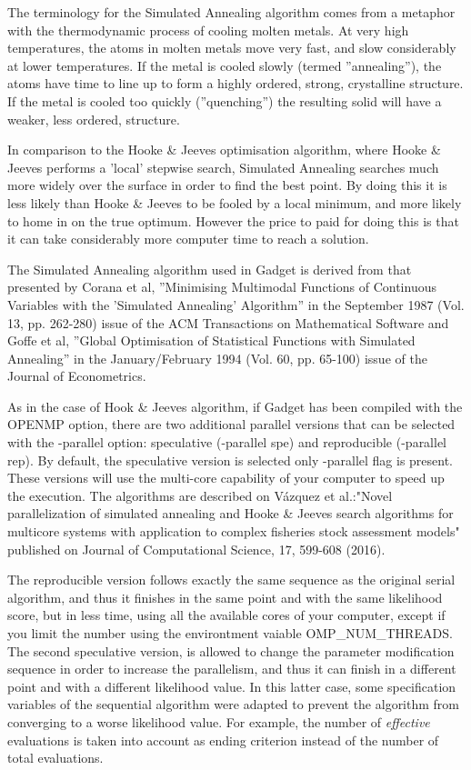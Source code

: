 \documentclass[10pt,twoside]{book}
\begin{document}
\bigskip
The terminology for the Simulated Annealing algorithm comes from a metaphor with the thermodynamic process of cooling molten metals.  At very high temperatures, the atoms in molten metals move very fast, and slow considerably at lower temperatures.  If the metal is cooled slowly (termed ''annealing''), the atoms have time to line up to form a highly ordered, strong, crystalline structure.  If the metal is cooled too quickly (''quenching'') the resulting solid will have a weaker, less ordered, structure.

\bigskip
In comparison to the Hooke \& Jeeves optimisation algorithm, where Hooke \& Jeeves performs a 'local' stepwise search, Simulated Annealing searches much more widely over the surface in order to find the best point.  By doing this it is less likely than Hooke \& Jeeves to be fooled by a local minimum, and more likely to home in on the true optimum.  However the price to paid for doing this is that it can take considerably more computer time to reach a solution.

\bigskip
The Simulated Annealing algorithm used in Gadget is derived from that presented by Corana et al, ''Minimising Multimodal Functions of Continuous Variables with the 'Simulated Annealing' Algorithm'' in the September 1987 (Vol. 13, pp. 262-280) issue of the ACM Transactions on Mathematical Software and Goffe et al, ''Global Optimisation of Statistical Functions with Simulated Annealing'' in the January/February 1994 (Vol. 60, pp. 65-100) issue of the Journal of Econometrics.

\bigskip
As in the case of Hook \& Jeeves algorithm, if Gadget has been compiled with the OPENMP option, there are two additional parallel versions that can be selected with the -parallel option: speculative (-parallel spe) and reproducible (-parallel rep). By default, the speculative version is selected only -parallel flag is present. These versions will use the multi-core capability of your computer to speed up the execution. The algorithms are described on V\'azquez et al.:"Novel parallelization of simulated annealing and Hooke \& Jeeves search algorithms for multicore systems with application to complex fisheries stock assessment models" published on Journal of Computational Science, 17, 599-608 (2016). 

\bigskip
The reproducible version follows exactly the same sequence as the original serial algorithm, and thus it finishes in the same point and with the same likelihood score, but in less time, using all the available cores of your computer, except if you limit the number using the environtment vaiable OMP\_NUM\_THREADS. The second speculative version, is allowed to change the parameter modification sequence in order to increase the parallelism, and thus it can finish in a different point and with a different likelihood value. In this latter case, some specification variables of the sequential algorithm were adapted to prevent the algorithm from converging to a worse likelihood value. For example, the number of \textit{effective} evaluations is taken into account as ending criterion instead of the number of total evaluations.
\end{document}
